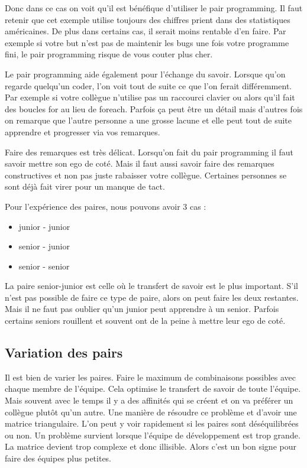 \documentclass[journal, a4paper, frenchb]{IEEEtran}
\begin{document}
Donc dans ce cas on voit qu’il est bénéfique d’utiliser le pair programming. Il faut retenir que cet exemple utilise toujours des chiffres  prient dans des statistiques américaines. De plus dans certains cas, il serait moins rentable d'en faire. Par exemple si votre but n’est pas de maintenir les bugs une fois votre programme fini, le pair programming risque de vous couter plus cher.

Le pair programming aide également pour l’échange du savoir. Lorsque qu’on regarde quelqu’un coder, l'on voit tout de suite ce que l'on ferait différemment. Par exemple si votre collègue n’utilise pas un raccourci clavier ou alors qu’il fait des boucles for au lieu de foreach. Parfois ça peut être un détail mais d’autres fois on remarque que l’autre personne a une grosse lacune et elle peut tout de suite apprendre et progresser via vos remarques.

Faire des remarques est très délicat. Lorsqu’on fait du pair programming il faut savoir mettre son ego de coté. Mais il faut aussi savoir faire des remarques constructives et non pas juste rabaisser votre collègue.  Certaines personnes se sont déjà fait virer pour un manque de tact.

Pour l’expérience des paires, nous pouvons avoir 3 cas :

\begin{itemize}
  \item junior - junior
  \item senior - junior
  \item senior - senior
\end{itemize}

La paire senior-junior est celle où le transfert de savoir est le plus important. S’il n’est pas possible de faire ce type de paire, alors on peut faire les deux restantes. Mais il ne faut pas oublier qu’un junior peut apprendre à un senior. Parfois certains seniors rouillent et souvent ont de la peine à mettre leur ego de coté.

\subsection{Variation des pairs}

Il est bien de varier les paires. Faire le maximum de combinaisons possibles avec chaque membre de l’équipe. Cela optimise le transfert de savoir de toute l’équipe. Mais souvent avec le temps il y a des affinités qui se créent et on va préférer un collègue plutôt qu’un autre. Une manière de résoudre ce problème et d’avoir une matrice triangulaire. L’on peut y voir rapidement si les paires sont déséquilibrées ou non. Un problème survient lorsque l’équipe de développement est trop grande. La matrice devient trop complexe et donc illisible. Alors c’est un bon signe pour faire des équipes plus petites. \cite{PPMatrix}
\end{document}
